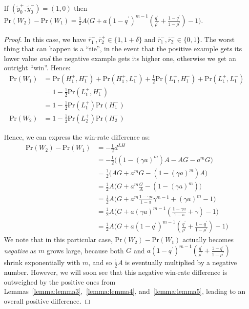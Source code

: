 \begin{lemma}
\label{lemma:lemma6}
If $(\tilde{y}_0^{+}, \tilde{y}_0^{-}) = (1,0)$ then $\textrm{Pr}(W_2) - \textrm{Pr}(W_1) = \frac{1}{2} A \Big(G + a (1 - q^{\prime})^{m-1} (\frac{q^{\prime}}{\rho^{\prime}} + \frac{1 - q^{\prime}}{1 - \rho^{\prime}}) - 1 \Big)$.
\end{lemma}

\begin{proof}
In this case, we have $\bar{r}_1^{+}, \bar{r}_2^{+} \in \{1, 1+\delta\}$ and $\bar{r}_1^{-}, \bar{r}_2^{-} \in \{0, 1\}$. The worst thing that can happen is a ``tie'', in the event that the positive example gets its lower value \textit{and} the negative example gets its higher one, otherwise we get an outright ``win''. Hence:
\begin{align}
\textrm{Pr}(W_1) &= \textrm{Pr}(H_1^{+}, H_1^{-}) + \textrm{Pr}(H_1^{+}, L_1^{-}) + \frac{1}{2} \textrm{Pr}(L_1^{+}, H_1^{-}) + \textrm{Pr}(L_1^{+}, L_1^{-})\\
&= 1 - \frac{1}{2} \textrm{Pr}(L_1^{+}, H_1^{-})\\
&= 1 - \frac{1}{2} \textrm{Pr}(L_1^{+}) \textrm{Pr}(H_1^{-})\\
\textrm{Pr}(W_2) &= 1 - \frac{1}{2} \textrm{Pr}(L_2^{+}) \textrm{Pr}(H_2^{-})
\end{align}

Hence, we can express the win-rate difference as:
\begin{align}
\textrm{Pr}(W_2) - \textrm{Pr}(W_1) &= -\frac{1}{2} d^{LH}\\
&= -\frac{1}{2} \Big( (1 - (\gamma a)^m) A - AG - a^m G \Big)\\
&= \frac{1}{2} \Big( AG + a^m G - (1  - (\gamma a)^m) A \Big)\\
&= \frac{1}{2} A \Big(G + a^m \frac{G}{A} - (1  - (\gamma a)^m) \Big)\\
&= \frac{1}{2} A \Big(G + a^m \frac{1 - \gamma a}{1 - a} \gamma^{m-1} + (\gamma a)^m - 1 \Big)\\
&= \frac{1}{2} A \Big(G + a (\gamma a)^{m-1} (\frac{1 - \gamma a}{1 - a} + \gamma) - 1 \Big)\\
&= \frac{1}{2} A \Big(G + a (1 - q^{\prime})^{m-1} (\frac{q^{\prime}}{\rho^{\prime}} + \frac{1 - q^{\prime}}{1 - \rho^{\prime}}) - 1 \Big)
\end{align}
We note that in this particular case, $\textrm{Pr}(W_2) - \textrm{Pr}(W_1)$ actually becomes \textit{negative} as $m$ grows large, because both $G$ and $a (1 - q^{\prime})^{m-1} (\frac{q^{\prime}}{\rho^{\prime}} + \frac{1 - q^{\prime}}{1 - \rho^{\prime}})$ shrink exponentially with $m$, and so $\frac{1}{2} A$ is eventually multiplied by a negative number. However, we will soon see that this negative win-rate difference is outweighed by the positive ones from Lemmas~\ref{lemma:lemma3},~\ref{lemma:lemma4}, and~\ref{lemma:lemma5}, leading to an overall positive difference.
\end{proof}

